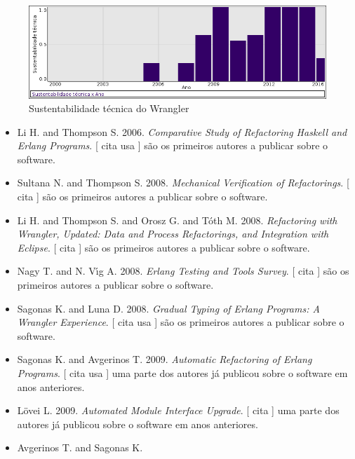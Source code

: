 \begin{figure}[h]
  \center
  \includegraphics[scale=0.50]{result-documents/charts/wrangler.png}
  \caption{Sustentabilidade técnica do Wrangler}
\end{figure}


\begin{itemize}
\item Li H. and Thompson S.
      2006.
        \textit{ Comparative Study of Refactoring Haskell and Erlang Programs}.
      [
          cita
          usa
      ]
são os primeiros autores a publicar sobre o software.
\item Sultana N. and Thompson S.
      2008.
        \textit{ Mechanical Verification of Refactorings}.
      [
          cita
      ]
são os primeiros autores a publicar sobre o software.
\item Li H. and Thompson S. and Orosz G. and T\'{o}th M.
      2008.
        \textit{ Refactoring with Wrangler, Updated: Data and Process Refactorings, and Integration with Eclipse}.
      [
          cita
      ]
são os primeiros autores a publicar sobre o software.
\item Nagy T. and N. V\'{\i}g A.
      2008.
        \textit{ Erlang Testing and Tools Survey}.
      [
          cita
      ]
são os primeiros autores a publicar sobre o software.
\item Sagonas K. and Luna D.
      2008.
        \textit{ Gradual Typing of Erlang Programs: A Wrangler Experience}.
      [
          cita
          usa
      ]
são os primeiros autores a publicar sobre o software.
\item Sagonas K. and Avgerinos T.
      2009.
        \textit{ Automatic Refactoring of Erlang Programs}.
      [
          cita
          usa
      ]
uma parte dos autores já publicou sobre o software em anos anteriores.
\item L\"{o}vei L.
      2009.
        \textit{ Automated Module Interface Upgrade}.
      [
          cita
      ]
uma parte dos autores já publicou sobre o software em anos anteriores.
\item Avgerinos T. and Sagonas K.

\end{itemize}
